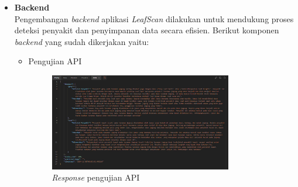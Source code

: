 \documentclass[journal,article,submit,pdftex,moreauthors]{Definitions/mdpi}
\begin{document}
\begin{itemize}
    \item \textbf{Backend} \\
    Pengembangan \textit{backend} aplikasi \textit{LeafScan} dilakukan untuk mendukung proses deteksi penyakit dan penyimpanan data secara efisien. Berikut komponen \textit{backend} yang sudah dikerjakan yaitu:

    \begin{itemize}
        \item Pengujian API
        \begin{figure}[H]
            \centering
            \includegraphics[width=0.8\textwidth]{Images/api_endpoint.png}
            \caption{\centering \textit{Response} pengujian API}
            \label{fig:activity-view-history}
        \end{figure}
    \end{itemize}
\end{itemize}


%

\end{document}
